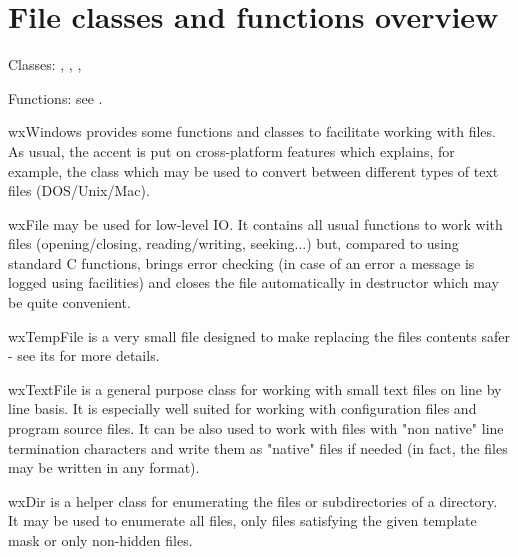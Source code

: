 \section{File classes and functions overview}\label{wxfileoverview}

Classes: , , , 

Functions: see .

wxWindows provides some functions and classes to facilitate working with files.
As usual, the accent is put on cross-platform features which explains, for
example, the  class which may be used to convert
between different types of text files (DOS/Unix/Mac).

wxFile may be used for low-level IO. It contains all usual functions to work
with files (opening/closing, reading/writing, seeking...) but, compared to
using standard C functions, brings error checking (in case of an error a message
is logged using  facilities) and closes the file
automatically in destructor which may be quite convenient.

wxTempFile is a very small file designed to make replacing the files contents
safer - see its  for more details.

wxTextFile is a general purpose class for working with small text files on line
by line basis. It is especially well suited for working with configuration files
and program source files. It can be also used to work with files with "non
native" line termination characters and write them as "native" files if needed
(in fact, the files may be written in any format).

wxDir is a helper class for enumerating the files or subdirectories of a
directory. It may be used to enumerate all files, only files satisfying the
given template mask or only non-hidden files.

